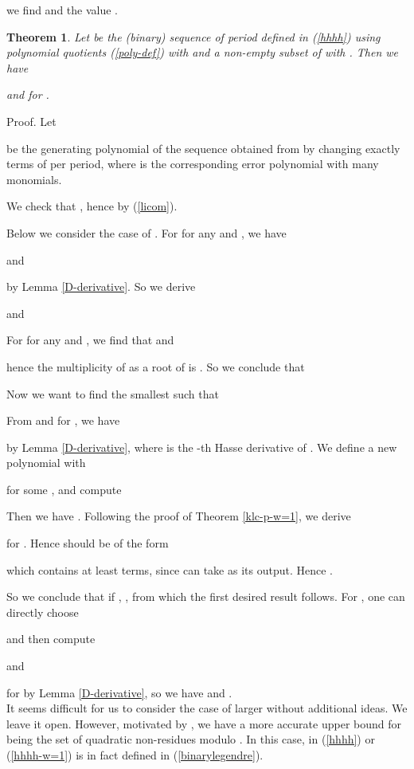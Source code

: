\documentclass [11pt,a4paper]{article}
\newtheorem{theorem}{Theorem}
\begin{document}
we find  and the value .     ~\hfill 




\begin{theorem}\label{klc-p-w=2}
Let  be the (binary) sequence of period  defined in (\ref{hhhh}) using polynomial quotients (\ref{poly-def}) with  and a non-empty subset  of  with .
Then we have

and  for .
\end{theorem}
Proof. Let

be the generating polynomial of the sequence obtained from  by changing exactly  terms of  per period,
where  is the corresponding error polynomial with  many  monomials.

We check that , hence  by (\ref{licom}).

Below we consider the case of . For  for any  and ,
we have

 and

by Lemma \ref{D-derivative}. So we derive

and

For  for any  and ,  we find that  and

hence the multiplicity of  as a root of  is . So we conclude that



Now we want to find the smallest  such that

From  and   for , we have

by Lemma \ref{D-derivative}, where   is the -th Hasse derivative of . We define a new polynomial  with

for some , and compute

Then we have . Following the proof of Theorem \ref{klc-p-w=1}, we derive

for . Hence  should be of the form

which contains at least  terms, since  can take  as its output. Hence .

So we conclude that if , , from which the first desired result follows.
For , one can directly choose

and then compute

and

for  by Lemma \ref{D-derivative}, so we have  and  .
 ~\hfill \\


It seems difficult for us to consider the case of larger  without additional ideas. We leave it open. However, motivated by \cite{AMW,AW06}, we have a more accurate upper bound for  being the set of quadratic non-residues modulo .
In this case,   in (\ref{hhhh}) or (\ref{hhhh-w=1}) is in fact  defined in (\ref{binarylegendre}).
\end{document}
